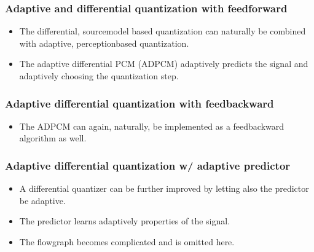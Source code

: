 \documentclass[letterpaper,10pt,english]{jupyterBook}
\begin{document}
\subsubsection{Adaptive and differential quantization with feed\sphinxhyphen{}forward}
\label{\detokenize{Representations/Waveform:adaptive-and-differential-quantization-with-feed-forward}}\begin{itemize}
\item {} 
\sphinxAtStartPar
The differential, source\sphinxhyphen{}model based quantization can naturally be combined with adaptive, perception\sphinxhyphen{}based quantization.

\item {} 
\sphinxAtStartPar
The adaptive differential PCM (ADPCM) adaptively predicts the signal and adaptively choosing the quantization step.

\end{itemize}

\sphinxAtStartPar
{}


\subsubsection{Adaptive differential quantization with feed\sphinxhyphen{}backward}
\label{\detokenize{Representations/Waveform:adaptive-differential-quantization-with-feed-backward}}\begin{itemize}
\item {} 
\sphinxAtStartPar
The ADPCM can again, naturally, be implemented as a feed\sphinxhyphen{}backward algorithm as well.

\end{itemize}


\subsubsection{Adaptive differential quantization w/ adaptive predictor}
\label{\detokenize{Representations/Waveform:adaptive-differential-quantization-w-adaptive-predictor}}\begin{itemize}
\item {} 
\sphinxAtStartPar
A differential quantizer can be further improved by letting also the
predictor be adaptive.

\item {} 
\sphinxAtStartPar
The predictor learns adaptively properties of the signal.

\item {} 
\sphinxAtStartPar
The flow\sphinxhyphen{}graph becomes complicated and is omitted here.

\end{itemize}
\end{document}
